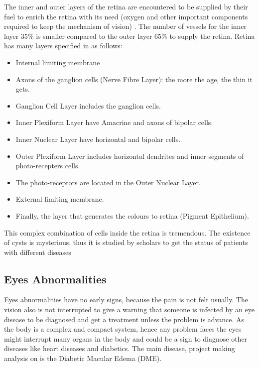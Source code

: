 The inner and outer layers of the retina  are encountered to be supplied by their fuel to enrich the retina with its need (oxygen and other important components required to keep the mechanism of vision) \cite{jonas1992count}.
The number of vessels for the inner layer 35\% is smaller compared to the outer layer 65\% to supply the retina.
Retina has many layers specified in \cite{abramoff2010retinal} as follows:
\begin{itemize}
\item Internal limiting membrane
\item Axons of the ganglion cells (Nerve Fibre Layer): the more the age, the thin it gets.
\item Ganglion Cell Layer includes the ganglion cells.
\item Inner Plexiform Layer have Amacrine and axons of bipolar cells.
\item Inner Nuclear Layer have horizontal and bipolar cells.
\item Outer Plexiform Layer includes horizontal dendrites and inner segments of photo-recepters cells.
\item The photo-receptors are located in the Outer Nuclear Layer.
\item External limiting membrane.
\item Finally, the layer that generates the colours to retina (Pigment Epithelium).
\end{itemize}
This complex combination of cells inside the retina is tremendous.
The existence of cysts is mysterious, thus it is studied by scholars to get the status of patients with different diseases \cite{jakobs2005retinal}

\subsection{Eyes Abnormalities}
Eyes abnormalities have no early signs, because the pain is not felt usually.
The vision also is not interrupted to give a warning that someone is infected by an eye disease to be diagnosed and get a treatment unless the problem is advance. 
As the body is a complex and compact system, hence any problem faces the eyes might interrupt many organs in the body and could be a sign to diagnose other diseases like heart diseases and diabetics.
The main disease, project making analysis on is the Diabetic Macular Edema (DME).

